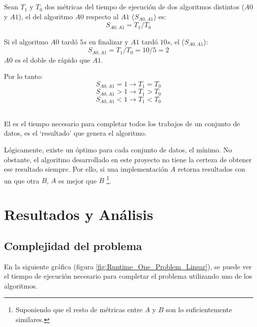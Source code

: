 \subsection{}

Sean $T_1$ y $T_0$ dos métricas del tiempo de ejecución
de dos algoritmos distintos ($A0$ y $A1$),
el  del algoritmo $A0$ respecto al $A1$ ($S_{A0,A1}$) es:
$$
    S_{A0,A1} = T_1 / T_0
$$

\begin{examplebox}
    Si el algoritmo $A0$ tardó $5s$ en finalizar y
    $A1$ tardó $10s$, el  ($S_{A0,A1}$):
    $$
        S_{A0,A1} = T_1 / T_0 = 10 / 5 = 2
    $$
    $A0$ es el doble de rápido que $A1$.
\end{examplebox}

Por lo tanto:
$$ S_{A0,A1} = 1 \rightarrow T_1 = T_0 $$ 
$$ S_{A0,A1} > 1 \rightarrow T_1 > T_0 $$ 
$$ S_{A0,A1} < 1 \rightarrow T_1 < T_0 $$

\subsection{}

El  es el tiempo necesario para completar
todos los trabajos de un conjunto de datos,
es el `resultado' que genera el algoritmo.

Lógicamente, existe un  óptimo para cada
conjunto de datos, el mínimo.
No obstante, el algoritmo desarrollado en este proyecto
no tiene la certeza de obtener ese resultado siempre.
Por ello, si una implementación $A$ retorna
resultados con un  que otra $B$,
$A$ es mejor que $B$ \footnote{
    Suponiendo que el resto de métricas entre $A$ y $B$
    son lo suficientemente similares.
}.

\section{Resultados y Análisis}

\subsection{Complejidad del problema}


En la siguiente gráfica (figura \ref{fig:Runtime_One_Problem_Linear}),
se puede ver el tiempo de ejecución
necesario para completar el problema utilizando uno de los
algoritmos.

